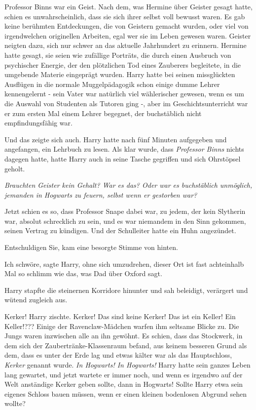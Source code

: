 Professor Binns war ein Geist. Nach dem, was Hermine über Geister gesagt hatte,
schien es unwahrscheinlich, dass sie sich ihrer selbst voll bewusst waren. Es
gab keine berühmten Entdeckungen, die von Geistern gemacht wurden, oder viel von
irgendwelchen originellen Arbeiten, egal wer sie im Leben gewesen waren. Geister
neigten dazu, sich nur schwer an das aktuelle Jahrhundert zu erinnern. Hermine
hatte gesagt, sie seien wie zufällige Porträts, die durch einen Ausbruch von
psychischer Energie, der den plötzlichen Tod eines Zauberers begleitete, in die
umgebende Materie eingeprägt wurden. Harry hatte bei seinen missglückten
Ausflügen in die normale Muggelpädagogik schon einige dumme Lehrer kennengelernt
- sein Vater war natürlich viel wählerischer gewesen, wenn es um die Auswahl von
Studenten als Tutoren ging -, aber im Geschichtsunterricht war er zum ersten Mal
einem Lehrer begegnet, der buchstäblich nicht empfindungsfähig war.

Und das zeigte sich auch. Harry hatte nach fünf Minuten aufgegeben und
angefangen, ein Lehrbuch zu lesen. Als klar wurde, dass \emph{\glqq Professor
Binns\grqq{}} nichts dagegen hatte, hatte Harry auch in seine Tasche gegriffen
und sich Ohrstöpsel geholt.

\emph{Brauchten Geister kein Gehalt? War es das? Oder war es buchstäblich
unmöglich, jemanden in Hogwarts zu feuern, selbst wenn er gestorben war?}

Jetzt schien es so, dass Professor Snape dabei war, zu jedem, der kein Slytherin
war, absolut schrecklich zu sein, und es war niemandem in den Sinn gekommen,
seinen Vertrag zu kündigen. Und der Schulleiter hatte ein Huhn angezündet.

\glqq Entschuldigen Sie\grqq{}, kam eine besorgte Stimme von hinten.

\glqq Ich schwöre\grqq{}, sagte Harry, ohne sich umzudrehen, \glqq dieser Ort
ist fast achteinhalb Mal so schlimm wie das, was Dad über Oxford sagt.\grqq{}

Harry stapfte die steinernen Korridore hinunter und sah beleidigt, verärgert und
wütend zugleich aus.

\glqq Kerker!\grqq{} Harry zischte. \glqq Kerker! Das sind keine Kerker! Das ist
ein Keller! Ein Keller!???\grqq{} Einige der Ravenclaw-Mädchen warfen ihm
seltsame Blicke zu. Die Jungs waren inzwischen alle an ihn gewöhnt. Es schien,
dass das Stockwerk, in dem sich der Zaubertränke-Klassenraum befand, aus keinem
besseren Grund als dem, dass es unter der Erde lag und etwas kälter war als das
Hauptschloss, \emph{\glqq Kerker\grqq{}} genannt wurde. \emph{In Hogwarts! In
Hogwarts! } Harry hatte sein ganzes Leben lang gewartet, und jetzt wartete er
immer noch, und wenn es irgendwo auf der Welt anständige Kerker geben sollte,
dann in Hogwarts! Sollte Harry etwa sein eigenes Schloss bauen müssen, wenn er
einen kleinen bodenlosen Abgrund sehen wollte?

